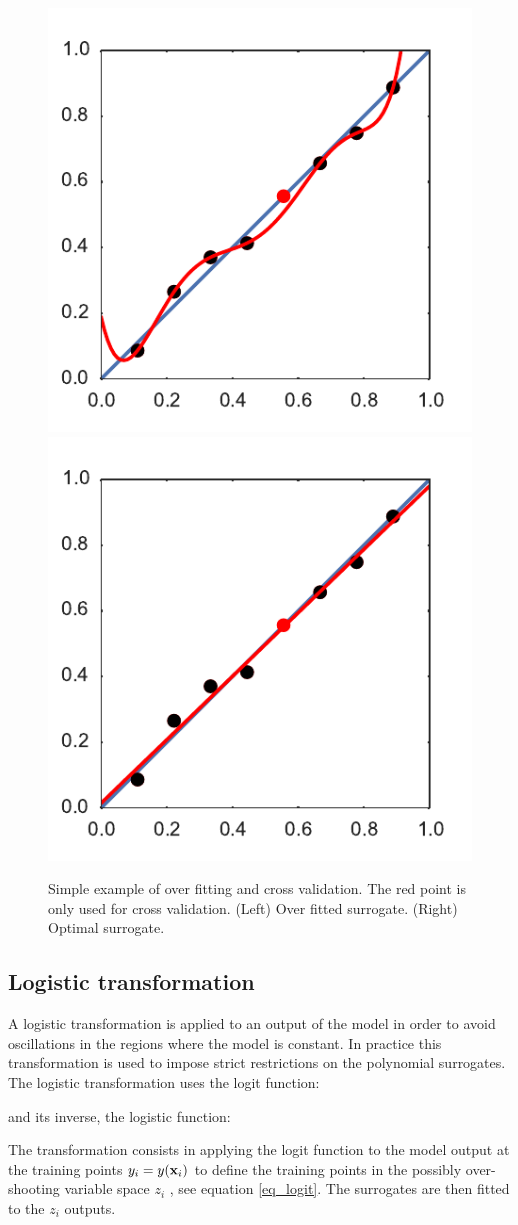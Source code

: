 \documentclass[preprint,12pt]{elsarticle}
\begin{document}
\begin{figure}[h!]
\begin{centering}
\includegraphics[width=0.3\columnwidth]{Figures/overfitting_CV.pdf}
\includegraphics[width=0.3\columnwidth]{Figures/overfitting_solved_CV.pdf}
\caption{Simple example of over fitting and cross validation. The red point is only used for cross validation. (Left) Over fitted surrogate. (Right) Optimal surrogate.}
\label{fig_overfitting}
\end{centering}
\end{figure}

\subsection{Logistic transformation}

A logistic transformation is applied to an output of the model in order to avoid oscillations in the regions where the model is constant. In practice this transformation is used to impose strict restrictions on the polynomial surrogates. The logistic transformation uses the logit function:


\noindent and its inverse, the logistic function:


The transformation consists in applying the logit function to the model output at the training points $y_i=y(\mathbf{x}_i)$ to define the training points in the possibly over-shooting variable space $z_i$ \cite{simard1998transformation}, see equation \ref{eq_logit}. The surrogates are then fitted to the $z_i$ outputs.
\end{document}
